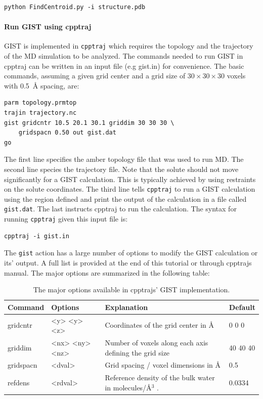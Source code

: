 \documentclass[9pt,tutorial]{livecoms}
\newcommand{\software}{\texttt}
\newcommand\inlinecode{\texttt}
\begin{document}
\begin{lstlisting}[style=bash]
python FindCentroid.py -i structure.pdb
\end{lstlisting}

\paragraph{Run GIST using cpptraj}
GIST is implemented in \software{cpptraj} which requires the topology and the trajectory of the MD simulation to be analyzed.
The commands needed to run GIST in cpptraj can be written in an input file (e.g gist.in) for convenience. The basic commands, assuming a given grid center and a grid size of $30\times30\times30$ voxels with \SI{0.5}{\angstrom} spacing, are:

\begin{lstlisting}[style=cpptraj]
parm topology.prmtop
trajin trajectory.nc
gist gridcntr 10.5 20.1 30.1 griddim 30 30 30 \
	gridspacn 0.50 out gist.dat
go
\end{lstlisting}

The first line specifies the amber topology file that was used to run MD. The second line species the trajectory file.
Note that the solute should not move significantly for a GIST calculation.
This is typically achieved by using restraints on the solute coordinates.
The third line tells \software{cpptraj} to run a GIST calculation using the region defined and print the output of the calculation in a file called \inlinecode{gist.dat}. The last instructs cpptraj to run the calculation.
The syntax for running \software{cpptraj} given this input file is:

\begin{lstlisting}[style=bash]
cpptraj -i gist.in
\end{lstlisting}

The \inlinecode{gist} action has a large number of options to modify the GIST calculation or its' output. A full list is provided at the end of this tutorial or through cpptrajs manual. The major options are summarized in the following table:

\begin{table}[h]
	\caption{The major options available in cpptrajs' GIST implementation.}\label{tab:GIST_options}
	\small
	\begin{tabularx}{\columnwidth}{@{}llXl@{}}
		\toprule
		Command       & Options & Explanation & Default  \\
		\midrule
		gridcntr    & <y> <y> <z> & Coordinates of the grid center in \AA & 0 0 0  \\
		griddim     & <nx> <ny> <nz> & Number of voxels along each axis defining the grid size & 40 40 40\\
		gridspacn & <dval> &Grid spacing / voxel dimensions in  \AA & 0.5    \\
		refdens         & <rdval> & Reference density of the bulk water in molecules/\AA$^3$ . & 0.0334    \\
		\bottomrule
	\end{tabularx}
\end{table}
\end{document}
